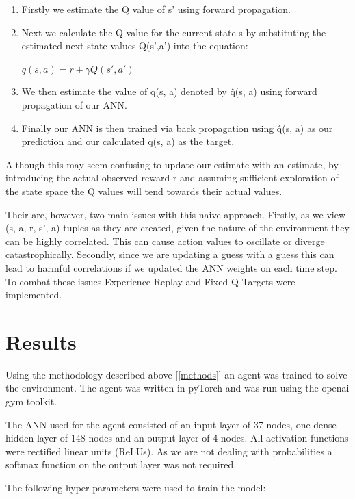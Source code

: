 \documentclass[12pt]{article}
\begin{document}
\begin{enumerate}
	\item Firstly we estimate the Q value of s' using forward propagation.
	\item Next we calculate the Q value for the current state s by substituting the estimated next state values Q(s',a') 
			into the equation:
	\begin{center}
		$q(s,a) = r+\gamma Q(s',a') $
	\end{center}
	\item We then estimate the value of q(s, a) denoted by \^q(s, a) using forward propagation of our ANN.
	\item Finally our ANN is then trained via back propagation using  \^q(s, a) as our prediction and our calculated q(s, a) as the target.
\end{enumerate}

Although this may seem confusing to update our estimate with an estimate, by introducing the actual observed reward r 
and assuming sufficient exploration of the state space the Q values will tend towards their actual values.

Their are, however, two main issues with this naive approach. 
Firstly, as we view (s, a, r, s', a) tuples as they are created, 
given the nature of the environment they can be highly correlated.
This can cause action values to oscillate or diverge catastrophically.
Secondly, since we are updating a guess with a guess this can lead to harmful correlations if we updated the ANN weights on each time step.
To combat these issues Experience Replay\cite{experience_replay} and Fixed Q-Targets\cite{deep_q_networks} were implemented.

\section{Results}

Using the methodology described above [\ref{methods}] an agent was trained to solve the environment.
The agent was written in pyTorch and was run using the openai gym toolkit.

The ANN used for the agent consisted of an input layer of 37 nodes, one dense hidden layer of 148 nodes and an output layer of 4 nodes.
All activation functions were rectified linear units (ReLUs). 
As we are not dealing with probabilities a softmax function on the output layer was not required.

The following hyper-parameters were used to train the model:
\end{document}
